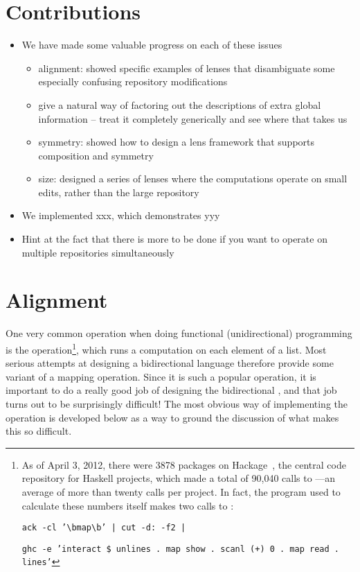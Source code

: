 \section{Contributions}
\label{sec:contributions}
\begin{itemize}
    \item We have made some valuable progress on each of these issues
        \begin{itemize}
            \item alignment: showed specific examples of lenses that
                disambiguate some especially confusing repository
                modifications
            \item give a natural way of factoring out the descriptions of
                extra global information -- treat it completely generically
                and see where that takes us
            \item symmetry: showed how to design a lens framework that
                supports composition and symmetry
            \item size: designed a series of lenses where the computations
                operate on small edits, rather than the large repository
        \end{itemize}
    \item We implemented xxx, which demonstrates yyy
    \item Hint at the fact that there is more to be done if you want to
        operate on multiple repositories simultaneously
\end{itemize}
\section{Alignment}
One very common operation when doing functional (unidirectional) programming
is the \map operation\footnote{As of April 3, 2012, there were 3878 packages
on Hackage~\cite{Hackage2012}, the central code repository for Haskell
projects, which made a total of 90,040 calls to \map---an average of more
than twenty calls per project. In fact, the program used to calculate these
numbers itself makes two calls to \map:

\noindent\texttt{ack -cl '\textbackslash bmap\textbackslash b' | cut -d: -f2 |}

\noindent\texttt{ghc -e 'interact \$ unlines . map show . scanl (+) 0 . map read . lines'}
}, which runs a computation on each element of a list. Most serious attempts
at designing a bidirectional language therefore provide some variant of a
mapping operation. Since it is such a popular operation, it is important to
do a really good job of designing the bidirectional \map, and that job turns
out to be surprisingly difficult! The most obvious way of implementing the
\map operation is developed below as a way to ground the discussion of what
makes this so difficult.

